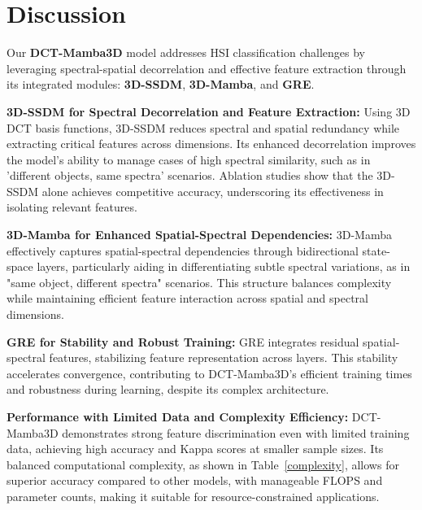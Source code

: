 \section{Discussion}
\label{sec:discussion}

Our \textbf{DCT-Mamba3D} model addresses HSI classification challenges by leveraging spectral-spatial decorrelation and effective feature extraction through its integrated modules: \textbf{3D-SSDM}, \textbf{3D-Mamba}, and \textbf{GRE}.

\textbf{3D-SSDM for Spectral Decorrelation and Feature Extraction:}  
Using 3D DCT basis functions, 3D-SSDM reduces spectral and spatial redundancy while extracting critical features across dimensions. Its enhanced decorrelation improves the model’s ability to manage cases of high spectral similarity, such as in 'different objects, same spectra' scenarios. Ablation studies show that the 3D-SSDM alone achieves competitive accuracy, underscoring its effectiveness in isolating relevant features.

\textbf{3D-Mamba for Enhanced Spatial-Spectral Dependencies:}  
3D-Mamba effectively captures spatial-spectral dependencies through bidirectional state-space layers, particularly aiding in differentiating subtle spectral variations, as in "same object, different spectra" scenarios. This structure balances complexity while maintaining efficient feature interaction across spatial and spectral dimensions.

\textbf{GRE for Stability and Robust Training:}  
GRE integrates residual spatial-spectral features, stabilizing feature representation across layers. This stability accelerates convergence, contributing to DCT-Mamba3D’s efficient training times and robustness during learning, despite its complex architecture.

\textbf{Performance with Limited Data and Complexity Efficiency:}  
DCT-Mamba3D demonstrates strong feature discrimination even with limited training data, achieving high accuracy and Kappa scores at smaller sample sizes. Its balanced computational complexity, as shown in Table~\ref{complexity}, allows for superior accuracy compared to other models, with manageable FLOPS and parameter counts, making it suitable for resource-constrained applications.


